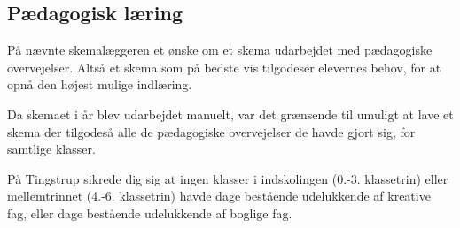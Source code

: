\subsection{Pædagogisk læring}
\label{paedagogisk_laering}
På \school nævnte skemalæggeren et ønske om et skema udarbejdet med pædagogiske overvejelser. Altså et skema som på bedste vis tilgodeser elevernes behov, for at opnå den højest mulige indlæring.

Da skemaet i år blev udarbejdet manuelt, var det grænsende til umuligt at lave et skema der tilgodeså alle de pædagogiske overvejelser de havde gjort sig, for samtlige klasser.

På Tingstrup sikrede dig sig at ingen klasser i indskolingen (0.-3. klassetrin) eller mellemtrinnet (4.-6. klassetrin) havde dage bestående udelukkende af kreative fag, eller dage bestående udelukkende af boglige fag. 